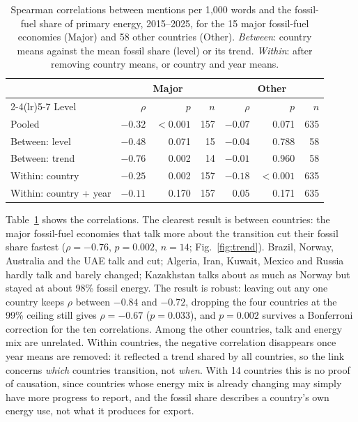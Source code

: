 \documentclass{llncs}
\begin{document}
\begin{table}[htbp]
    \centering
    \caption{Spearman correlations between mentions per 1{,}000 words and the fossil-fuel share of primary energy, 2015--2025, for the 15 major fossil-fuel economies (Major) and 58 other countries (Other). \emph{Between}: country means against the mean fossil share (level) or its trend. \emph{Within}: after removing country means, or country and year means.}
    \label{tab:rq1}
    \begin{tabular}{lrrrrrr}
        \toprule
         & \multicolumn{3}{c}{Major} & \multicolumn{3}{c}{Other} \\
        \cmidrule(lr){2-4}\cmidrule(lr){5-7}
        Level & $\rho$ & $p$ & $n$ & $\rho$ & $p$ & $n$ \\
        \midrule
        Pooled & $-0.32$ & $<0.001$ & 157 & $-0.07$ & 0.071 & 635 \\
        Between: level & $-0.48$ & 0.071 & 15 & $-0.04$ & 0.788 & 58 \\
        Between: trend & $-0.76$ & 0.002 & 14 & $-0.01$ & 0.960 & 58 \\
        Within: country & $-0.25$ & 0.002 & 157 & $-0.18$ & $<0.001$ & 635 \\
        Within: country + year & $-0.11$ & 0.170 & 157 & 0.05 & 0.171 & 635 \\
        \bottomrule
    \end{tabular}
\end{table}

Table~\ref{tab:rq1} shows the correlations. The clearest result is between countries: the major fossil-fuel economies that talk more about the transition cut their fossil share fastest ($\rho = -0.76$, $p = 0.002$, $n = 14$; Fig.~\ref{fig:trend}). Brazil, Norway, Australia and the UAE talk and cut; Algeria, Iran, Kuwait, Mexico and Russia hardly talk and barely changed; Kazakhstan talks about as much as Norway but stayed at about 98\% fossil energy. The result is robust: leaving out any one country keeps $\rho$ between $-0.84$ and $-0.72$, dropping the four countries at the 99\% ceiling still gives $\rho = -0.67$ ($p = 0.033$), and $p = 0.002$ survives a Bonferroni correction for the ten correlations. Among the other countries, talk and energy mix are unrelated. Within countries, the negative correlation disappears once year means are removed: it reflected a trend shared by all countries, so the link concerns \emph{which} countries transition, not \emph{when}. With 14 countries this is no proof of causation, since countries whose energy mix is already changing may simply have more progress to report, and the fossil share describes a country's own energy use, not what it produces for export.
\end{document}
